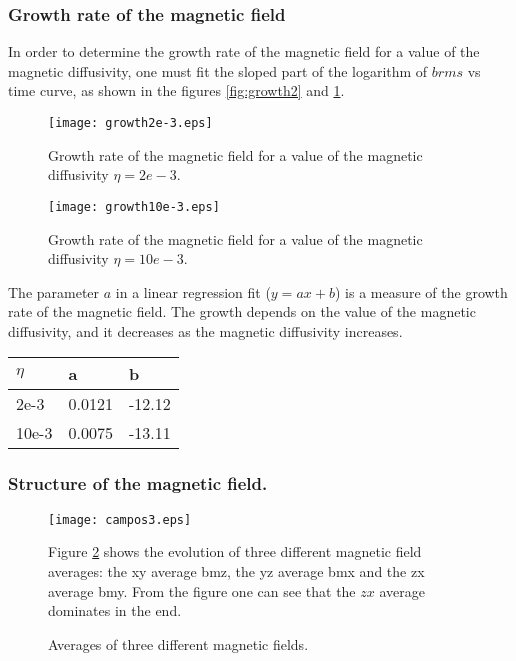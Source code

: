 \subsubsection{Growth rate of the magnetic field}

In order to determine the growth rate of the magnetic field for a value of the magnetic diffusivity, one must fit the sloped part of the logarithm of $brms$ vs time curve, as shown in the figures \ref{fig:growth2} and \ref{fig:growth10}.

\begin{figure}[h]
\begin{minipage}{.45\textwidth}
\centering
\texttt{[image: growth2e-3.eps]}
\caption{Growth rate of the magnetic field for a value of the magnetic diffusivity  $\eta = 2e-3$.}
\label{fig:growth2}
\end{minipage}
\hspace{0.5cm}
\begin{minipage}{.45\textwidth}
\centering
 \texttt{[image: growth10e-3.eps]}
\caption{Growth rate of the magnetic field for a value of the magnetic diffusivity  $\eta = 10e-3$.}
\label{fig:growth10}
\end{minipage}
 \end{figure}
The parameter $a$ in a linear regression fit ($y=ax+b$) is a measure of the growth rate of the magnetic field. The growth depends on the value of the magnetic diffusivity, and it decreases as the magnetic diffusivity increases.
\begin{center}
\begin{tabular}{lll}
$\eta$ & a & b\\\hline
2e-3 & 0.0121 & -12.12\\
10e-3 & 0.0075 & -13.11
\end{tabular}
\end{center}

\subsubsection{Structure of the magnetic field.}

\begin{figure}[h]
\begin{minipage}{.45\textwidth}

\centering
\texttt{[image: campos3.eps]}
\caption{Averages of three different magnetic fields.}
\label{fig:averages}

\end{minipage}
\hspace{0.5cm}
\begin{minipage}{.45\textwidth}
Figure \ref{fig:averages} shows the evolution of three different magnetic field averages: the xy average bmz, the yz average bmx and the zx average bmy. 
From the figure one can see that the $zx$ average dominates in the end.
\end{minipage}
 \end{figure}

